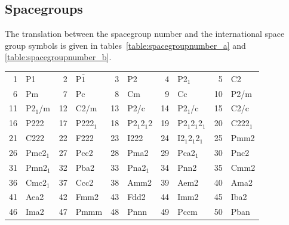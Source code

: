 \documentclass[final,12pt,makeidx,DIV=calc]{article}
\begin{document}
{{{{{{%
\newpage
\subsection{Spacegroups}
The translation between the spacegroup number and the international
space group symbols is given in tables~\ref{table:spacegroupnumber_a}
and \ref{table:spacegroupnumber_b}.
\begin{table}[h!]
\begin{center}
\begin{tabular}{||r|l||r|l||r|l||r|l||r|l||}
\hline
1      & P1                 & 
2      & P$\bar{1}$         & 
3      & P2                 & 
4      & P2$_1$             & 
5      & C2                 \\
6      & Pm                 & 
7      & Pc                 & 
8      & Cm                 & 
9      & Cc                 & 
10     & P2/m               \\
11     & P2$_1$/m           & 
12     & C2/m               & 
13     & P2/c               & 
14     & P2$_1$/c           & 
15     & C2/c               \\
16     & P222               & 
17     & P222$_1$           & 
18     & P2$_1$2$_1$2       & 
19     & P2$_1$2$_1$2$_1$   & 
20     & C222$_1$           \\
21     & C222               & 
22     & F222               & 
23     & I222               & 
24     & I2$_1$2$_1$2$_1$   & 
25     & Pmm2               \\
26     & Pmc2$_1$           & 
27     & Pcc2               & 
28     & Pma2               & 
29     & Pca2$_1$           & 
30     & Pnc2               \\
31     & Pmn2$_1$           & 
32     & Pba2               & 
33     & Pna2$_1$           & 
34     & Pnn2               & 
35     & Cmm2               \\
36     & Cmc2$_1$           & 
37     & Ccc2               & 
38     & Amm2               & 
39     & Aem2               & 
40     & Ama2               \\
41     & Aea2               & 
42     & Fmm2               & 
43     & Fdd2               & 
44     & Imm2               & 
45     & Iba2               \\
46     & Ima2               & 
47     & Pmmm               & 
48     & Pnnn               & 
49     & Pccm               & 
50     & Pban               \\

\end{tabular}
\end{center}
\end{table}}}}}}}
\end{document}
